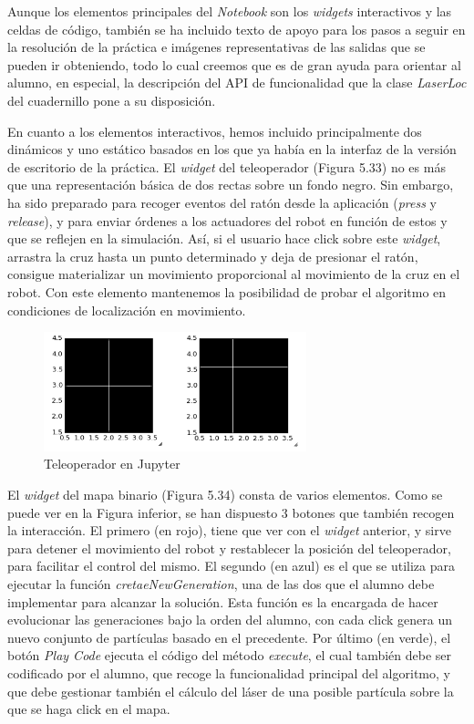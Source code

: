 Aunque los elementos principales del \textit{Notebook} son los \textit{widgets} interactivos y las celdas de código, también se ha incluido texto de apoyo para los pasos a seguir en la resolución de la práctica e imágenes representativas de las salidas que se pueden ir obteniendo, todo lo cual creemos que es de gran ayuda para orientar al alumno, en especial, la descripción del API de funcionalidad que la clase \textit{LaserLoc} del cuadernillo pone a su disposición.

En cuanto a los elementos interactivos, hemos incluido principalmente dos dinámicos y uno estático basados en los que ya había en la interfaz de la versión de escritorio de la práctica. El \textit{widget} del teleoperador (Figura 5.33) no es más que una representación básica de dos rectas sobre un fondo negro. Sin embargo, ha sido preparado para recoger eventos del ratón desde la aplicación (\textit{press} y \textit{release}), y para enviar órdenes a los actuadores del robot en función de estos y que se reflejen en la simulación. Así, si el usuario hace click sobre este \textit{widget}, arrastra la cruz hasta un punto determinado y deja de presionar el ratón, consigue materializar un movimiento proporcional al movimiento de la cruz en el robot. Con este elemento mantenemos la posibilidad de probar el algoritmo en condiciones de localización en movimiento. 

\begin{figure}[H]
	\begin{center}
		\includegraphics[width=0.68\textwidth]{figures/teleoperadorjupyter.png}
		\caption{Teleoperador en Jupyter}
		\label{fig.laserlocjupyter}
		\end{center}
\end{figure}


El \textit{widget} del mapa binario (Figura 5.34) consta de varios elementos. Como se puede ver en la Figura inferior, se han dispuesto 3 botones que también recogen la interacción. El primero (en rojo), tiene que ver con el \textit{widget} anterior, y sirve para detener el movimiento del robot y restablecer la posición del teleoperador, para facilitar el control del mismo. El segundo (en azul) es el que se utiliza para ejecutar la función \textit{cretaeNewGeneration}, una de las dos que el alumno debe implementar para alcanzar la solución. Esta función es la encargada de hacer evolucionar las generaciones bajo la orden del alumno, con cada click genera un nuevo conjunto de partículas basado en el precedente. Por último (en verde), el botón \textit{Play Code} ejecuta el código del método \textit{execute}, el cual también debe ser codificado por el alumno, que recoge la funcionalidad principal del algoritmo, y que debe gestionar también el cálculo del láser de una posible partícula sobre la que se haga click en el mapa.

